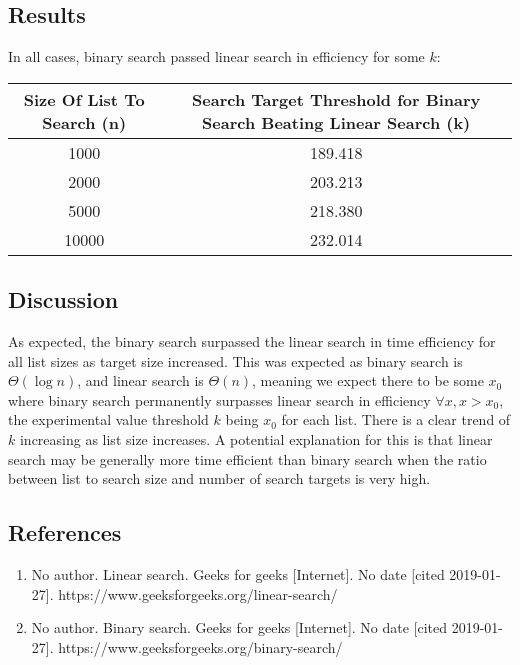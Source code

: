 \documentclass{article}
\begin{document}
	\subsection*{Results}
		In all cases, binary search passed linear search in efficiency for some $k$:
		\begin{table}[ht]
			\centering
			\begin{tabular}{|c|c|}
			\hline
			\hline
			{Size Of List To Search (n)} & Search Target Threshold for Binary Search Beating Linear Search (k)\\ 				\hline
			1000 & 189.418 \\
			2000 & 203.213 \\
			5000 & 218.380 \\
			10000 & 232.014 \\
			\hline
			\end{tabular}
		\end{table}
	\subsection*{Discussion}
	As expected, the binary search surpassed the linear search in time efficiency for all list sizes as target size increased. This was expected as binary search is $\Theta(\log n)$, and linear search is $\Theta(n)$, meaning we expect there to be some $x_0$ where binary search permanently surpasses linear search in efficiency $\forall x, x>x_0$, the experimental value threshold $k$ being $x_0$ for each list. There is a clear trend of $k$ increasing as list size increases. A potential explanation for this is that linear search may be generally more time efficient than binary search when the ratio between list to search size and number of search targets is very high. 	
	\newpage
	\subsection*{References}
	\begin{enumerate}
		\item No author. Linear search. Geeks for geeks [Internet]. No date [cited 2019-01-27]. https://www.geeksforgeeks.org/linear-search/
		\item No author. Binary search. Geeks for geeks [Internet]. No date [cited 2019-01-27]. https://www.geeksforgeeks.org/binary-search/
	\end{enumerate}
\end{document}
